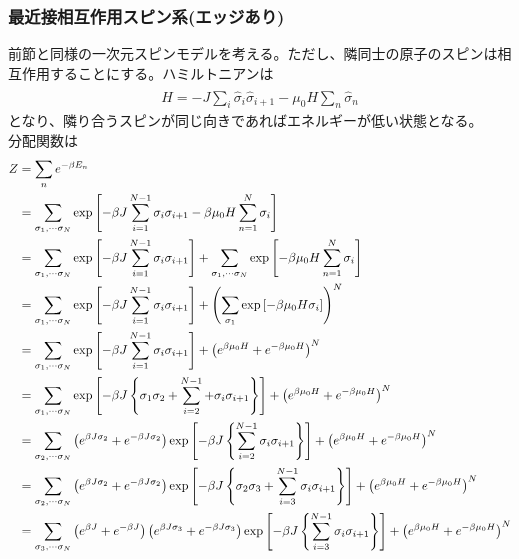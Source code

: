 \documentclass[dvipdfmx, 11pt, a4paper]{jsarticle}
\theoremstyle{definition}
\begin{document}
\subsubsection{最近接相互作用スピン系(エッジあり)}
    前節と同様の一次元スピンモデルを考える。ただし、隣同士の原子のスピンは相互作用することにする。ハミルトニアンは
    \begin{align}
        \hat{H} = -J\sum_i \hat{\sigma}_i \hat{\sigma}_{i+1} - \mu_0 H \sum_n \hat{\sigma}_n
    \end{align}
    となり、隣り合うスピンが同じ向きであればエネルギーが低い状態となる。\\
    分配関数は
    \begin{align}
        Z &= \sum_n e^{-\beta E_n} \notag \\
        &= \sum_{\sigma_1, \cdots \sigma_N} \exp \left[ -\beta J\sum_{i=1}^{N-1} \sigma_i \sigma_{i+1} - \beta \mu_0 H \sum_{n=1}^N \sigma_i \right] \notag \\
        &= \sum_{\sigma_1, \cdots \sigma_N} \exp \left[ -\beta J\sum_{i=1}^{N-1} \sigma_i \sigma_{i+1} \right] + \sum_{\sigma_1, \cdots \sigma_N} \exp \left[ - \beta \mu_0 H \sum_{n=1}^N \sigma_i \right] \notag \\
        &= \sum_{\sigma_1, \cdots \sigma_N} \exp \left[ -\beta J\sum_{i=1}^{N-1} \sigma_i \sigma_{i+1} \right] + \left( \sum_{\sigma_1} \exp \left[ - \beta \mu_0 H \sigma_i \right] \right)^N \notag \\
        &= \sum_{\sigma_1, \cdots \sigma_N} \exp \left[ -\beta J\sum_{i=1}^{N-1} \sigma_i \sigma_{i+1} \right] + \left( e^{\beta \mu_0 H} + e^{-\beta \mu_0 H}\right)^N \notag \\
        &= \sum_{\sigma_1, \cdots \sigma_N} \exp \left[ -\beta J \left\{ \sigma_1 \sigma_2 + \sum_{i=2}^{N-1} + \sigma_i \sigma_{i+1}  \right\} \right] + \left( e^{\beta \mu_0 H} + e^{-\beta \mu_0 H}\right)^N \notag \\
        &= \sum_{\sigma_2, \cdots \sigma_N} \left( e^{\beta J\sigma_2} + e^{-\beta J\sigma_2} \right) \exp \left[ -\beta J \left\{ \sum_{i=2}^{N-1}  \sigma_i \sigma_{i+1}  \right\} \right] + \left( e^{\beta \mu_0 H} + e^{-\beta \mu_0 H}\right)^N \notag \\
        &= \sum_{\sigma_2, \cdots \sigma_N} \left( e^{\beta J\sigma_2} + e^{-\beta J\sigma_2} \right) \exp \left[ -\beta J \left\{ \sigma_2 \sigma_3 + \sum_{i=3}^{N-1} \sigma_i \sigma_{i+1}  \right\} \right] + \left( e^{\beta \mu_0 H} + e^{-\beta \mu_0 H}\right)^N \notag \\
        &= \sum_{\sigma_3, \cdots \sigma_N} \left( e^{\beta J} + e^{-\beta J} \right) \left( e^{\beta J\sigma_3} + e^{-\beta J\sigma_3} \right) \exp \left[ -\beta J \left\{ \sum_{i=3}^{N-1} \sigma_i \sigma_{i+1}  \right\} \right] + \left( e^{\beta \mu_0 H} + e^{-\beta \mu_0 H}\right)^N \notag \\

\end{align}
\end{document}
